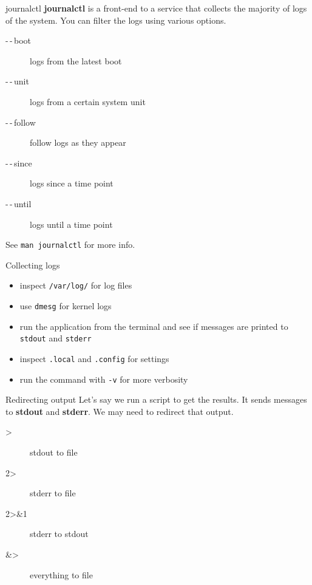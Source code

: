 \documentclass[12pt]{beamer}
\begin{document}
\begin{frame}[fragile]{journalctl}
\textbf{journalctl} is a front-end to a service that collects the majority of logs of the system. You can filter the logs using various options.

\begin{description}
	\item[-\,-\,boot] logs from the latest boot
	\item[-\,-\,unit] logs from a certain system unit
	\item[-\,-\,follow] follow logs as they appear
	\item[-\,-\,since] logs since a time point
	\item[-\,-\,until] logs until a time point
\end{description}

\vspace{5pt}

See {\color{blue}\texttt{man journalctl}} for more info.
\end{frame}

\begin{frame}{Collecting logs}
\begin{itemize}
	\item inspect {\color{blue} \texttt{/var/log/}} for log files 
	\item use {\color{blue} \texttt{dmesg}} for kernel logs 
	\item run the application from the terminal and see if messages are printed to \texttt{stdout} and \texttt{stderr}
	\item inspect {\color{blue} \texttt{.local}} and {\color{blue} \texttt{.config}} for settings 
	\item run the command with {\color{blue} \texttt{-v}} for more verbosity
\end{itemize}	
\end{frame}

\begin{frame}{Redirecting output}
Let's say we run a script to get the results. It sends messages to \textbf{stdout} and \textbf{stderr}. We may need to redirect that output.
\begin{description}
	\item[>] stdout to file
	\item[2>] stderr to file
	\item[2>\&1] stderr to stdout
	\item[\&>] everything to file
\end{description}
\end{frame}
\end{document}
